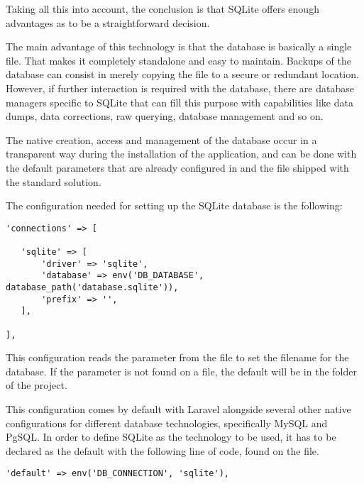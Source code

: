 Taking all this into account, the conclusion is that SQLite offers enough advantages as to be a straightforward decision.

The main advantage of this technology is that the database is basically a single file. That makes it completely standalone and easy to maintain. Backups of the database can consist in merely copying the file to a secure or redundant location. However, if further interaction is required with the database, there are database managers specific to SQLite that can fill this purpose with capabilities like data dumps, data corrections, raw querying, database management and so on.

The native creation, access and management of the database occur in a transparent way during the installation of the application, and can be done with the default parameters that are already configured in  and the  file shipped with the standard solution.

The configuration needed for setting up the SQLite database is the following:

\begin{verbatim}
'connections' => [

   'sqlite' => [
       'driver' => 'sqlite',
       'database' => env('DB_DATABASE', database_path('database.sqlite')),
       'prefix' => '',
   ],

],
\end{verbatim}

This configuration reads the  parameter from the  file to set the filename for the database. If the parameter is not found on a  file, the default will be  in the  folder of the project.

This configuration comes by default with Laravel alongside several other native configurations for different database technologies, specifically MySQL and PgSQL. In order to define SQLite as the technology to be used, it has to be declared as the default with the following line of code, found on the  file.

\begin{verbatim}
'default' => env('DB_CONNECTION', 'sqlite'),
\end{verbatim}

